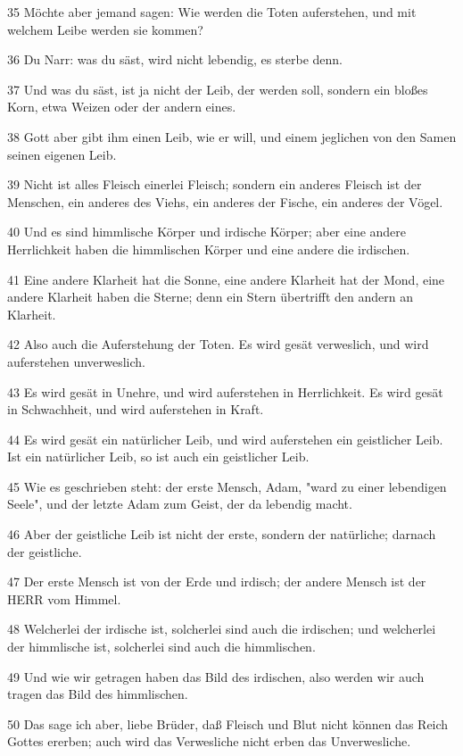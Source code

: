 \par 35 Möchte aber jemand sagen: Wie werden die Toten auferstehen, und mit welchem Leibe werden sie kommen?
\par 36 Du Narr: was du säst, wird nicht lebendig, es sterbe denn.
\par 37 Und was du säst, ist ja nicht der Leib, der werden soll, sondern ein bloßes Korn, etwa Weizen oder der andern eines.
\par 38 Gott aber gibt ihm einen Leib, wie er will, und einem jeglichen von den Samen seinen eigenen Leib.
\par 39 Nicht ist alles Fleisch einerlei Fleisch; sondern ein anderes Fleisch ist der Menschen, ein anderes des Viehs, ein anderes der Fische, ein anderes der Vögel.
\par 40 Und es sind himmlische Körper und irdische Körper; aber eine andere Herrlichkeit haben die himmlischen Körper und eine andere die irdischen.
\par 41 Eine andere Klarheit hat die Sonne, eine andere Klarheit hat der Mond, eine andere Klarheit haben die Sterne; denn ein Stern übertrifft den andern an Klarheit.
\par 42 Also auch die Auferstehung der Toten. Es wird gesät verweslich, und wird auferstehen unverweslich.
\par 43 Es wird gesät in Unehre, und wird auferstehen in Herrlichkeit. Es wird gesät in Schwachheit, und wird auferstehen in Kraft.
\par 44 Es wird gesät ein natürlicher Leib, und wird auferstehen ein geistlicher Leib. Ist ein natürlicher Leib, so ist auch ein geistlicher Leib.
\par 45 Wie es geschrieben steht: der erste Mensch, Adam, "ward zu einer lebendigen Seele", und der letzte Adam zum Geist, der da lebendig macht.
\par 46 Aber der geistliche Leib ist nicht der erste, sondern der natürliche; darnach der geistliche.
\par 47 Der erste Mensch ist von der Erde und irdisch; der andere Mensch ist der HERR vom Himmel.
\par 48 Welcherlei der irdische ist, solcherlei sind auch die irdischen; und welcherlei der himmlische ist, solcherlei sind auch die himmlischen.
\par 49 Und wie wir getragen haben das Bild des irdischen, also werden wir auch tragen das Bild des himmlischen.
\par 50 Das sage ich aber, liebe Brüder, daß Fleisch und Blut nicht können das Reich Gottes ererben; auch wird das Verwesliche nicht erben das Unverwesliche.
